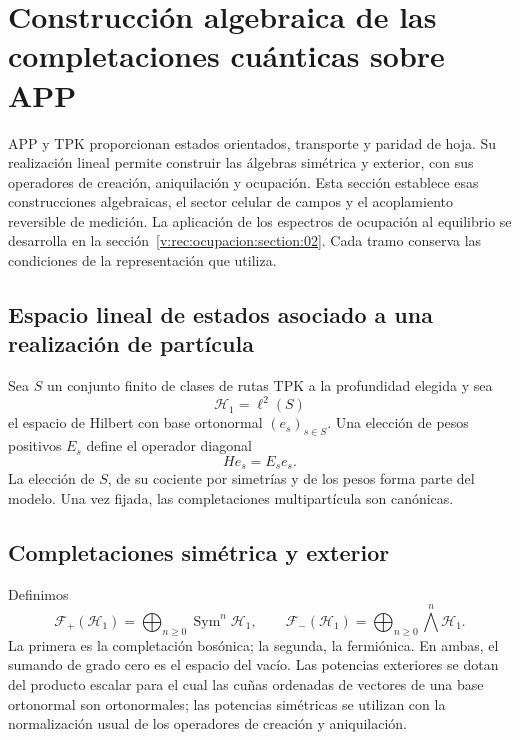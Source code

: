 \section{Construcción algebraica de las completaciones cuánticas sobre APP}
\label{v:rec:chap:completaciones-cuanticas}
\label{v:sec:completaciones-algebraicas}

APP y TPK proporcionan estados orientados, transporte y paridad de hoja.
Su realización lineal permite construir las álgebras simétrica y exterior,
con sus operadores de creación, aniquilación y ocupación. Esta sección
establece esas construcciones algebraicas, el sector celular de campos y
el acoplamiento reversible de medición. La aplicación de los espectros de ocupación al equilibrio se desarrolla en la sección~\ref{v:rec:ocupacion:section:02}.
Cada tramo conserva las condiciones de la representación que utiliza.

\subsection{Espacio lineal de estados asociado a una realización de partícula}
\label{v:rec:completaciones:section:02}

Sea \(S\) un conjunto finito de clases de rutas TPK a la profundidad elegida
y sea
\[
 \mathcal H_1=\ell^2(S)
\]
el espacio de Hilbert con base ortonormal \((e_s)_{s\in S}\). Una elección de
pesos positivos \(E_s\) define el operador diagonal
\[
 He_s=E_se_s.
\]
La elección de \(S\), de su cociente por simetrías y de los pesos forma parte
del modelo. Una vez fijada, las completaciones multipartícula son canónicas.

\subsection{Completaciones simétrica y exterior}
\label{v:rec:completaciones:section:03}

Definimos
\[
 \mathcal F_+(\mathcal H_1)=
 \bigoplus_{n\geq0}\operatorname{Sym}^n\mathcal H_1,
 \qquad
 \mathcal F_-(\mathcal H_1)=
 \bigoplus_{n\geq0}\bigwedge^n\mathcal H_1.
\]
La primera es la completación bosónica; la segunda, la fermiónica. En ambas,
el sumando de grado cero es el espacio del vacío. Las potencias exteriores
se dotan del producto escalar para el cual las cuñas ordenadas de vectores
de una base ortonormal son ortonormales; las potencias simétricas se utilizan
con la normalización usual de los operadores de creación y aniquilación.

